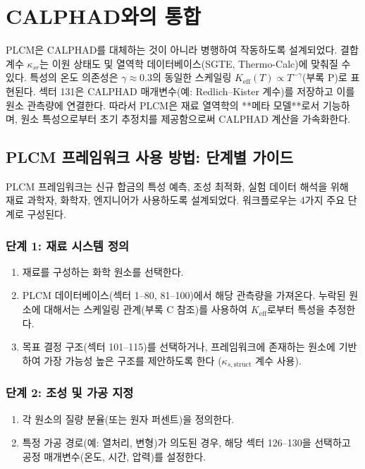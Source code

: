 \documentclass[12pt,a4paper]{article}
\newcommand{\Keff}{K_{\mathrm{eff}}}
\begin{document}
	\section{CALPHAD와의 통합}
	
	PLCM은 CALPHAD를 대체하는 것이 아니라 병행하여 작동하도록 설계되었다. 결합 계수 \(\kappa_{sr}\)는 이원 상태도 및 열역학 데이터베이스(SGTE, Thermo-Calc)에 맞춰질 수 있다. 특성의 온도 의존성은 \(\gamma \approx 0.3\)의 동일한 스케일링 \(\Keff(T) \propto T^{-\gamma}\)(부록 P)로 표현된다. 섹터 131은 CALPHAD 매개변수(예: Redlich–Kister 계수)를 저장하고 이를 원소 관측량에 연결한다. 따라서 PLCM은 재료 열역학의 **메타 모델**로서 기능하며, 원소 특성으로부터 초기 추정치를 제공함으로써 CALPHAD 계산을 가속화한다.
	
	\subsection{PLCM 프레임워크 사용 방법: 단계별 가이드}
	
	PLCM 프레임워크는 신규 합금의 특성 예측, 조성 최적화, 실험 데이터 해석을 위해 재료 과학자, 화학자, 엔지니어가 사용하도록 설계되었다. 워크플로우는 4가지 주요 단계로 구성된다.
	
	\subsubsection{단계 1: 재료 시스템 정의}
	
	\begin{enumerate}
		\item 재료를 구성하는 화학 원소를 선택한다.
		\item PLCM 데이터베이스(섹터 1–80, 81–100)에서 해당 관측량을 가져온다. 누락된 원소에 대해서는 스케일링 관계(부록 C 참조)를 사용하여 \(\Keff\)로부터 특성을 추정한다.
		\item 목표 결정 구조(섹터 101–115)를 선택하거나, 프레임워크에 존재하는 원소에 기반하여 가장 가능성 높은 구조를 제안하도록 한다 (\(\kappa_{s,\text{struct}}\) 계수 사용).
	\end{enumerate}
	
	\subsubsection{단계 2: 조성 및 가공 지정}
	
	\begin{enumerate}
		\item 각 원소의 질량 분율(또는 원자 퍼센트)을 정의한다.
		\item 특정 가공 경로(예: 열처리, 변형)가 의도된 경우, 해당 섹터 126–130을 선택하고 공정 매개변수(온도, 시간, 압력)를 설정한다.
	\end{enumerate}
	
\end{document}
